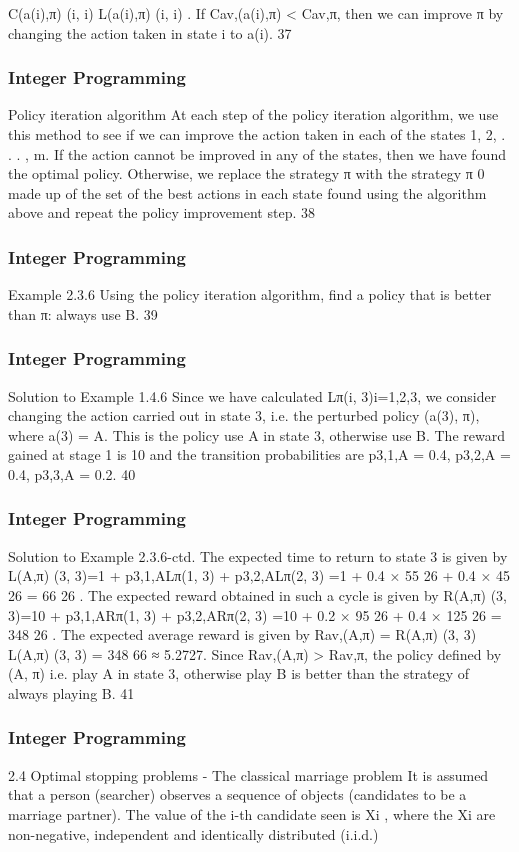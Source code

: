 \begin{frame}
C(a(i),π)
(i, i)
L(a(i),π)
(i, i)
.
If Cav,(a(i),π) < Cav,π, then we can improve π by changing the
action taken in state i to a(i).
37 \end{frame}  \begin{frame} \frametitle{Integer Programming}     
Policy iteration algorithm
At each step of the policy iteration algorithm, we use this method
to see if we can improve the action taken in each of the states
1, 2, . . . , m.
If the action cannot be improved in any of the states, then we have
found the optimal policy.
Otherwise, we replace the strategy π with the strategy π
0 made up
of the set of the best actions in each state found using the
algorithm above and repeat the policy improvement step.
38 \end{frame}  \begin{frame} \frametitle{Integer Programming}     
Example 2.3.6
Using the policy iteration algorithm, find a policy that is better
than π: always use B.
39 \end{frame}  \begin{frame} \frametitle{Integer Programming}     
Solution to Example 1.4.6
Since we have calculated {Lπ(i, 3)}i=1,2,3, we consider changing
the action carried out in state 3, i.e. the perturbed policy
(a(3), π), where a(3) = A. This is the policy use A in state 3,
otherwise use B.
The reward gained at stage 1 is 10 and the transition probabilities
are p3,1,A = 0.4, p3,2,A = 0.4, p3,3,A = 0.2.
40 \end{frame}  \begin{frame} \frametitle{Integer Programming}     
Solution to Example 2.3.6-ctd.
The expected time to return to state 3 is given by
L(A,π)
(3, 3)=1 + p3,1,ALπ(1, 3) + p3,2,ALπ(2, 3)
=1 + 0.4 ×
55
26
+ 0.4 ×
45
26
=
66
26
.
The expected reward obtained in such a cycle is given by
R(A,π)
(3, 3)=10 + p3,1,ARπ(1, 3) + p3,2,ARπ(2, 3)
=10 + 0.2 ×
95
26
+ 0.4 ×
125
26
=
348
26
.
The expected average reward is given by
Rav,(A,π) =
R(A,π)
(3, 3)
L(A,π)
(3, 3) =
348
66
≈ 5.2727.
Since Rav,(A,π) > Rav,π, the policy defined by (A, π) i.e. play A in
state 3, otherwise play B is better than the strategy of always
playing B.
41 \end{frame}  \begin{frame} \frametitle{Integer Programming}     
2.4 Optimal stopping problems - The classical marriage
problem
It is assumed that a person (searcher) observes a sequence of
objects (candidates to be a marriage partner).
The value of the i-th candidate seen is Xi
, where the Xi are
non-negative, independent and identically distributed (i.i.d.)

\end{frame}
